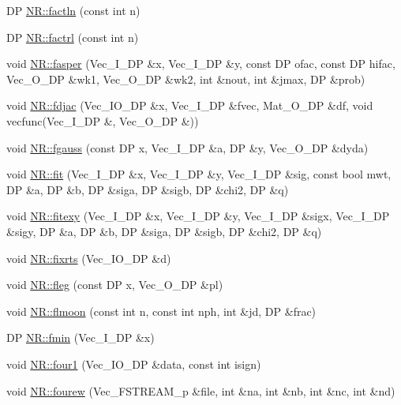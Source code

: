 \begin{DoxyCompactItemize}
DP \mbox{\hyperlink{namespaceNR_a828437d33b110b7b79516767e7df7b23}{N\+R\+::factln}} (const int n)
\item 
DP \mbox{\hyperlink{namespaceNR_ac76d8c81ea3f7dacb7bc39f8f2e67f0a}{N\+R\+::factrl}} (const int n)
\item 
void \mbox{\hyperlink{namespaceNR_a28ce9fba247ed103e2ffb545d671840e}{N\+R\+::fasper}} (Vec\+\_\+\+I\+\_\+\+DP \&x, Vec\+\_\+\+I\+\_\+\+DP \&y, const DP ofac, const DP hifac, Vec\+\_\+\+O\+\_\+\+DP \&wk1, Vec\+\_\+\+O\+\_\+\+DP \&wk2, int \&nout, int \&jmax, DP \&prob)
\item 
void \mbox{\hyperlink{namespaceNR_af8ad4af19ff3fab8ac42dea99a9ccfae}{N\+R\+::fdjac}} (Vec\+\_\+\+I\+O\+\_\+\+DP \&x, Vec\+\_\+\+I\+\_\+\+DP \&fvec, Mat\+\_\+\+O\+\_\+\+DP \&df, void vecfunc(Vec\+\_\+\+I\+\_\+\+DP \&, Vec\+\_\+\+O\+\_\+\+DP \&))
\item 
void \mbox{\hyperlink{namespaceNR_a68c568aec5a9a2199de3c66ecc87c062}{N\+R\+::fgauss}} (const DP x, Vec\+\_\+\+I\+\_\+\+DP \&a, DP \&y, Vec\+\_\+\+O\+\_\+\+DP \&dyda)
\item 
void \mbox{\hyperlink{namespaceNR_aa9df2e2aa873647992817340091009dd}{N\+R\+::fit}} (Vec\+\_\+\+I\+\_\+\+DP \&x, Vec\+\_\+\+I\+\_\+\+DP \&y, Vec\+\_\+\+I\+\_\+\+DP \&sig, const bool mwt, DP \&a, DP \&b, DP \&siga, DP \&sigb, DP \&chi2, DP \&q)
\item 
void \mbox{\hyperlink{namespaceNR_acf4acd9066a65dc4408580a722f9d043}{N\+R\+::fitexy}} (Vec\+\_\+\+I\+\_\+\+DP \&x, Vec\+\_\+\+I\+\_\+\+DP \&y, Vec\+\_\+\+I\+\_\+\+DP \&sigx, Vec\+\_\+\+I\+\_\+\+DP \&sigy, DP \&a, DP \&b, DP \&siga, DP \&sigb, DP \&chi2, DP \&q)
\item 
void \mbox{\hyperlink{namespaceNR_abd5e28d80b44e108348ecc80785afa7c}{N\+R\+::fixrts}} (Vec\+\_\+\+I\+O\+\_\+\+DP \&d)
\item 
void \mbox{\hyperlink{namespaceNR_a069ca1a540d6d9637ab168a19fc6d86d}{N\+R\+::fleg}} (const DP x, Vec\+\_\+\+O\+\_\+\+DP \&pl)
\item 
void \mbox{\hyperlink{namespaceNR_afd394882e21b8378572c186fb66220af}{N\+R\+::flmoon}} (const int n, const int nph, int \&jd, DP \&frac)
\item 
DP \mbox{\hyperlink{namespaceNR_a570c7b20deac021db5e798650ceb157f}{N\+R\+::fmin}} (Vec\+\_\+\+I\+\_\+\+DP \&x)
\item 
void \mbox{\hyperlink{namespaceNR_aaff3ae4c060df78a4b5da02651af126d}{N\+R\+::four1}} (Vec\+\_\+\+I\+O\+\_\+\+DP \&data, const int isign)
\item 
void \mbox{\hyperlink{namespaceNR_a8dd403b5378f2cc7dec76ae5b837f05d}{N\+R\+::fourew}} (Vec\+\_\+\+F\+S\+T\+R\+E\+A\+M\+\_\+p \&file, int \&na, int \&nb, int \&nc, int \&nd)

\end{DoxyCompactItemize}
